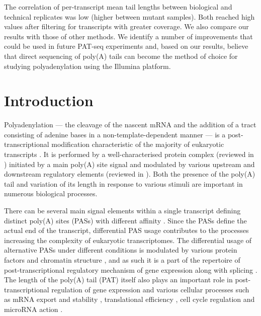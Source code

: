 \documentclass[10pt]{article}
\begin{document}
The correlation of per-transcript mean tail lengths between biological and technical replicates was low (higher between mutant samples). Both reached high values after filtering for transcripts with greater coverage. We also compare our results with those of other methods. We identify a number of improvements that could be used in future PAT-seq experiments and, based on our results, believe that direct sequencing of poly(A) tails can become the method of choice for studying polyadenylation using the Illumina platform.

\section*{Introduction}

Polyadenylation --- the cleavage of the nascent mRNA and the addition of a tract consisting of adenine bases in a non-template-dependent manner --- is a post-transcriptional modification characteristic of the majority of eukaryotic transcripts \cite{zhao99,elkon13,tian13}. It is performed by a well-characterised protein complex (reviewed in \cite{zhao99}) initiated by a main poly(A) site signal and modulated by various upstream and downstream regulatory elements (reviewed in \cite{tian11,weill12}). Both the presence of the poly(A) tail and variation of its length in response to various stimuli are important in numerous biological processes.

There can be several main signal elements within a single transcript defining distinct poly(A) sites (PASs) with different affinity \cite{tian13,elkon13}. Since the PASs define the actual end of the transcript, differential PAS usage contributes to the processes increasing the complexity of eukaryotic transcriptomes. The differential usage of alternative PASs under different conditions is modulated by various protein factors and chromatin structure \cite{tian13}, and as such it is a part of the repertoire of post-transcriptional regulatory mechanism of gene expression along with splicing \cite{licatalosi10}. The length of the poly(A) tail (PAT) itself also plays an important role in post-transcriptional regulation of gene expression and various cellular processes such as mRNA export \cite{fuke07} and stability \cite{lackner07,eckmann11,weill12}, translational efficiency \cite{weill12}, cell cycle regulation \cite{mendez01} and microRNA action \cite{moretti12}.
\end{document}
